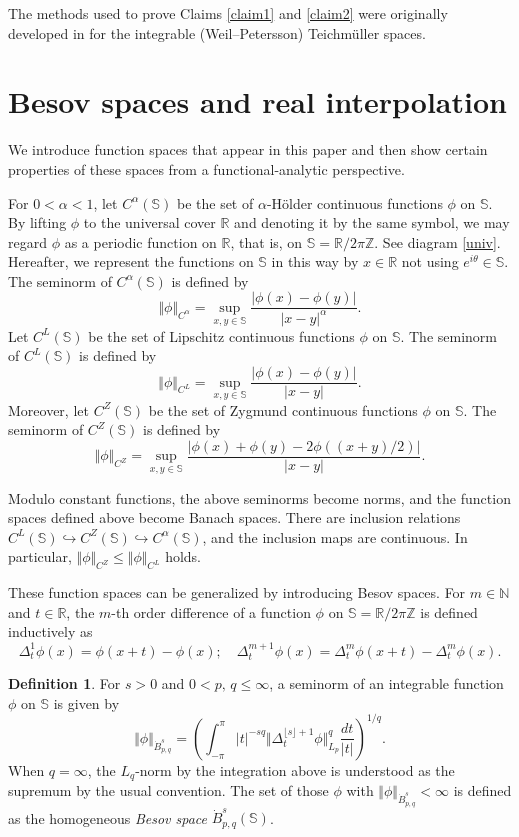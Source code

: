 \documentclass[amstex]{amsart}
\theoremstyle{definition}
\newtheorem{definition}[theorem]{Definition}
\theoremstyle{remark}
\numberwithin{equation}{section}
\begin{document}
The methods used to prove Claims \ref{claim1} and \ref{claim2} were originally developed in \cite{M6}
for the integrable (Weil--Petersson) Teichm\"uller spaces.


\section{Besov spaces and real interpolation}\label{2}

We introduce function spaces that appear in this paper and
then show certain properties of these spaces from a functional-analytic perspective.

For $0<\alpha<1$, let $C^\alpha(\mathbb S)$ be the set of $\alpha$-H\"older 
continuous functions $\phi$ on $\mathbb S$. By lifting $\phi$ to the universal cover $\mathbb R$
and denoting it by the same symbol, we may regard $\phi$ as a periodic function on $\mathbb R$,
that is, on $\mathbb S=\mathbb R/2\pi \mathbb Z$. See diagram \eqref{univ}. Hereafter, we represent
the functions on $\mathbb S$ in this way by $x \in \mathbb R$ not using $e^{i\theta} \in \mathbb S$.
The seminorm of $C^\alpha(\mathbb S)$ is defined by
$$
\Vert \phi \Vert_{C^\alpha}=\sup_{x,y \in \mathbb S} \frac{|\phi(x)-\phi(y)|}{|x-y|^\alpha}.
$$
Let $C^L(\mathbb S)$ be the set of Lipschitz continuous functions 
$\phi$ on $\mathbb S$. 
The seminorm of $C^L(\mathbb S)$ is defined by
$$
\Vert \phi \Vert_{C^L}=\sup_{x,y \in \mathbb S} \frac{|\phi(x)-\phi(y)|}{|x-y|}.
$$
Moreover, let $C^Z(\mathbb S)$ be the set of Zygmund
continuous functions $\phi$ on $\mathbb S$. 
The seminorm of $C^Z(\mathbb S)$ is defined by
$$
\Vert \phi \Vert_{C^Z}=\sup_{x,y \in \mathbb S} \frac{|\phi(x)+\phi(y)-2\phi((x+y)/2)|}{|x-y|}.
$$

Modulo constant functions, the above seminorms become norms, and
the function spaces defined above become Banach spaces.
There are inclusion relations 
$C^L(\mathbb S) \hookrightarrow C^Z(\mathbb S) \hookrightarrow C^\alpha(\mathbb S)$,
and the inclusion maps are continuous. In particular, 
$\Vert \phi \Vert_{C^Z} \leq \Vert \phi \Vert_{C^L}$ holds.

These function spaces can be generalized by introducing Besov spaces.
For $m \in \mathbb{N}$ and $t \in \mathbb{R}$, 
the $m$-th order difference of a function $\phi$ on $\mathbb{S}=\mathbb R/2\pi \mathbb Z$ is defined inductively as
$$
\Delta_t^1 \phi(x) = \phi(x+t) - \phi(x); \quad
\Delta_t^{m+1} \phi(x) = \Delta_t^m \phi(x+t) - \Delta_t^m \phi(x).
$$

\begin{definition}
For $s >0$ and $0 < p,\, q \leq \infty$, a seminorm of an integrable 
function $\phi$ on $\mathbb{S}$ is given by
$$
\Vert \phi \Vert_{\dot B^s_{p,q}} = \left(\int_{-\pi}^{\pi}
|t|^{-sq} \Vert \Delta_t^{\lfloor s \rfloor+1} \phi \Vert_{L_p}^q \frac{dt}{|t|}
\right)^{1/q}.
$$
When $q=\infty$, the $L_q$-norm by the integration above is understood as the supremum by the usual convention.
The set of those $\phi$ with $\Vert \phi \Vert_{\dot B^s_{p,q}} < \infty$ is defined as the homogeneous {\it Besov space}
$\dot B^s_{p,q}(\mathbb S)$.
\end{definition}
\end{document}
